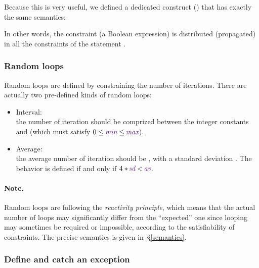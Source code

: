 Because  this  is  very  useful,  we defined  a  dedicated  construct
() that has exactly the same semantics:

\begin{example}
\begin{program}
     
\end{program}
\end{example}
In other  words, the constraint   (a Boolean  expression) is
distributed  (propagated) in  all  the constraints  of the  statement
.



\subsubsection{Random loops}
 
Random loops are defined by constraining the number of iterations. 
There are actually two pre-defined kinds of random loops:\\
\begin{itemize}
\item  Interval:     \\  the   number  of
  iteration  should  be   comprized  between  the  integer  constants
   and  (which  must satisfy $0 \leq \syn{min} \leq
  \syn{max}$).
\item  Average: \\  the  average number  of
  iteration should  be , with a  standard deviation .
  The behavior is defined if and only if $4*\syn{sd} < \syn{av}$.
\end{itemize}

\paragraph{Note.}
Random  loops are  following  the {\em  reactivity principle},  which
means that the  actual number of loops may  significantly differ from
the  ``expected'' one  since  looping may  sometimes  be required  or
impossible,  according  to  the  satisfiability of  constraints.  The
precise semantics is given in~\S\ref{semantics}.



\subsubsection{Define and catch an exception}

